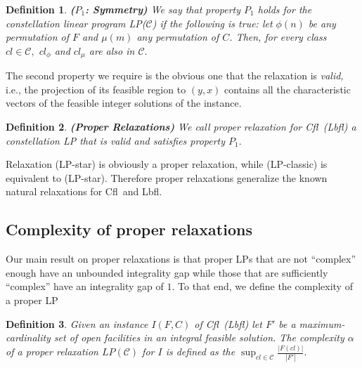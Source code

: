\documentclass[11pt]{article}\usepackage{amsmath}
\newtheorem{definition}{Definition}[section]
\newcommand{\lbfl}{{\sc Lbfl}}
\newcommand{\cfl}{{\sc Cfl}}
\begin{document}
\begin{definition} {\bf ($P_1$: Symmetry)} \label{def:symmetry}
We  say  that property  $P_1$  holds for the constellation linear program LP($\mathcal{C}$)   if  the
following is  true: let $\phi  (n)$ be any  permutation of $F$  and $\mu
(m)$ any permutation of $C$.
 Then, for every  class $cl \in \mathcal{C},$  $cl_{\phi}$ 
and $cl_{\mu}$ are also in $\mathcal{C}.$
\end{definition}

The second property we require is the obvious one that the 
relaxation  is {\em valid,} i.e., the projection of its  feasible region to 
$(y,x)$ contains all the characteristic vectors of the feasible integer solutions of the instance.



\begin{definition}  {\bf (Proper Relaxations)}  \label{def:proper} 
We call {\em proper relaxation}  for \cfl\ (\lbfl\/)  a constellation LP
 that is valid and satisfies property $P_1.$ 
\end{definition}


Relaxation (LP-star) is
obviously a proper relaxation, while (LP-classic) is equivalent to
(LP-star). Therefore proper relaxations generalize the known natural
relaxations for \cfl\ and \lbfl. 









\subsection{Complexity of proper relaxations}
\label{proper proof}

Our main result on proper relaxations is that     proper LPs that  are not
``complex'' enough have an unbounded integrality gap while those  that
are sufficiently ``complex'' have an integrality gap of $1.$  To that end, we
define  the complexity  of  a  proper LP 
\iffalse
Furthermore, for each  such facility  $i$ we  denote by
$C_{cl}(i)$ the  set of clients  $j$ for which  there is a facility  $i$ so
that $x_{ij}=1$ in $(y,x)_{cl}$.
\fi 

\begin{definition}   \label{def:complexity}
Given an instance $I(F,C)$ of \cfl\ (\lbfl\/)
let $F'$ be  a 
maximum-cardinality set  of open facilities in an integral feasible
solution. The {\em complexity $\alpha$} of a  proper
relaxation $LP(\mathcal{C})$ for $I$ is
defined as the $\sup_{cl \in \mathcal{C}} \frac{|F(cl)|}{|F'|}.$ 
\end{definition}
\end{document}
